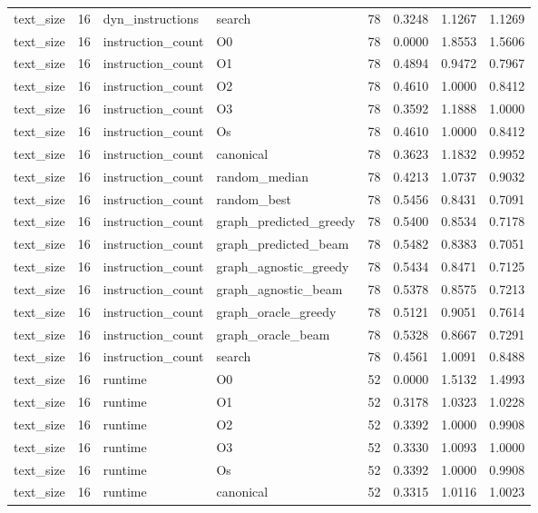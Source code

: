 \begin{table}[t]
\begin{tabular}{lrllrrrr}
text\_size & 16 & dyn\_instructions & search & 78 & 0.3248 & 1.1267 & 1.1269 \\
text\_size & 16 & instruction\_count & O0 & 78 & 0.0000 & 1.8553 & 1.5606 \\
text\_size & 16 & instruction\_count & O1 & 78 & 0.4894 & 0.9472 & 0.7967 \\
text\_size & 16 & instruction\_count & O2 & 78 & 0.4610 & 1.0000 & 0.8412 \\
text\_size & 16 & instruction\_count & O3 & 78 & 0.3592 & 1.1888 & 1.0000 \\
text\_size & 16 & instruction\_count & Os & 78 & 0.4610 & 1.0000 & 0.8412 \\
text\_size & 16 & instruction\_count & canonical & 78 & 0.3623 & 1.1832 & 0.9952 \\
text\_size & 16 & instruction\_count & random\_median & 78 & 0.4213 & 1.0737 & 0.9032 \\
text\_size & 16 & instruction\_count & random\_best & 78 & 0.5456 & 0.8431 & 0.7091 \\
text\_size & 16 & instruction\_count & graph\_predicted\_greedy & 78 & 0.5400 & 0.8534 & 0.7178 \\
text\_size & 16 & instruction\_count & graph\_predicted\_beam & 78 & 0.5482 & 0.8383 & 0.7051 \\
text\_size & 16 & instruction\_count & graph\_agnostic\_greedy & 78 & 0.5434 & 0.8471 & 0.7125 \\
text\_size & 16 & instruction\_count & graph\_agnostic\_beam & 78 & 0.5378 & 0.8575 & 0.7213 \\
text\_size & 16 & instruction\_count & graph\_oracle\_greedy & 78 & 0.5121 & 0.9051 & 0.7614 \\
text\_size & 16 & instruction\_count & graph\_oracle\_beam & 78 & 0.5328 & 0.8667 & 0.7291 \\
text\_size & 16 & instruction\_count & search & 78 & 0.4561 & 1.0091 & 0.8488 \\
text\_size & 16 & runtime & O0 & 52 & 0.0000 & 1.5132 & 1.4993 \\
text\_size & 16 & runtime & O1 & 52 & 0.3178 & 1.0323 & 1.0228 \\
text\_size & 16 & runtime & O2 & 52 & 0.3392 & 1.0000 & 0.9908 \\
text\_size & 16 & runtime & O3 & 52 & 0.3330 & 1.0093 & 1.0000 \\
text\_size & 16 & runtime & Os & 52 & 0.3392 & 1.0000 & 0.9908 \\
text\_size & 16 & runtime & canonical & 52 & 0.3315 & 1.0116 & 1.0023 \\

\end{tabular}
\end{table}
